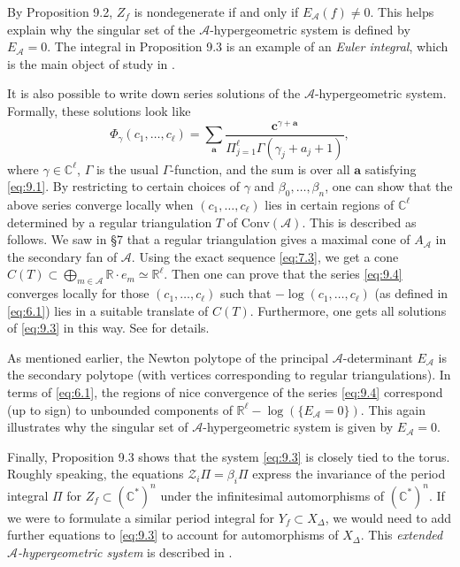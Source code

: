 \documentclass{amsart}
\theoremstyle{plain}
\theoremstyle{definition}
\begin{document}
	By Proposition 9.2, $Z_f$ is nondegenerate if and only if
$E_{\mathcal{A}}(f) \ne 0$.  This helps explain why the singular set of
the $\mathcal{A}$-hypergeometric system is defined by $E_{\mathcal{A}} = 0$.
The integral in Proposition 9.3 is an example of an {\it Euler
integral\/}, which is the main object of study in \cite{GKZ2}.

	It is also possible to write down series solutions of the
$\mathcal{A}$-hypergeometric system.  Formally, these solutions look like
\begin{equation}
\Phi_\gamma(c_1,\dots,c_\ell) = \sum_{\mathbf{a}} \frac{\mathbf{c}^{\gamma
+ \mathbf{a}}}{\Pi_{j=1}^\ell \Gamma(\gamma_j + a_j + 1)},
\tag{9.4}\label{eq:9.4}
\end{equation}
where $\gamma \in \mathbb{C}^\ell$, $\Gamma$ is the usual
$\Gamma$-function, and the sum is over all $\mathbf{a}$ satisfying
\eqref{eq:9.1}.  By restricting to certain choices of $\gamma$ and 
$\beta_0,\dots,\beta_n$, one can show that the above series converge
locally when $(c_1,\dots,c_\ell)$ lies in certain regions of $\mathbb{C}^\ell$ determined by a regular triangulation $T$ of
$\mathrm{Conv}(\mathcal{A})$.  This is described as follows.  We saw in \S7
that a regular triangulation gives a maximal cone of $A_{\mathcal{A}}$ in
the secondary fan of $\mathcal{A}$.  Using the exact sequence
\eqref{eq:7.3}, we get a cone $C(T) \subset \bigoplus_{m\in \mathcal{A}}
\mathbb{R}\cdot e_m \simeq \mathbb{R}^\ell$.  Then one can prove that the
series \eqref{eq:9.4} converges locally for those $(c_1,\dots,c_\ell)$
such that $-\log(c_1,\dots,c_\ell)$ (as defined in \eqref{eq:6.1}) lies
in a suitable translate of $C(T)$.  Furthermore, one gets all
solutions of \eqref{eq:9.3} in this way.  See \cite{GKZ3} for details.

	As mentioned earlier, the Newton polytope of the principal
$\mathcal{A}$-determinant $E_{\mathcal{A}}$ is the secondary polytope (with
vertices corresponding to regular triangulations).  In terms of
\eqref{eq:6.1}, the regions of nice convergence of the series
\eqref{eq:9.4} correspond (up to sign) to unbounded components of $\mathbb{R}^\ell - \log(\{E_{\mathcal{A}} = 0\})$.  This again illustrates why the
singular set of $\mathcal{A}$-hypergeometric system is given by
$E_{\mathcal{A}} = 0$.

	Finally, Proposition 9.3 shows that the system \eqref{eq:9.3} is
closely tied to the torus.  Roughly speaking, the equations
$\mathcal{Z}_i\Pi =\beta_i\Pi$ express the invariance of the period
integral $\Pi$ for $Z_f \subset (\mathbb{C}^*)^n$ under the
infinitesimal automorphisms of $(\mathbb{C}^*)^n$.  If we were to
formulate a similar period integral for %
$Y_f \subset X_\Delta$, we would need to add further equations to
\eqref{eq:9.3} to account for automorphisms of $X_\Delta$. %
This {\it extended $\mathcal{A}$-hypergeometric system\/}
is described in \cite{HLY1}.
\end{document}
